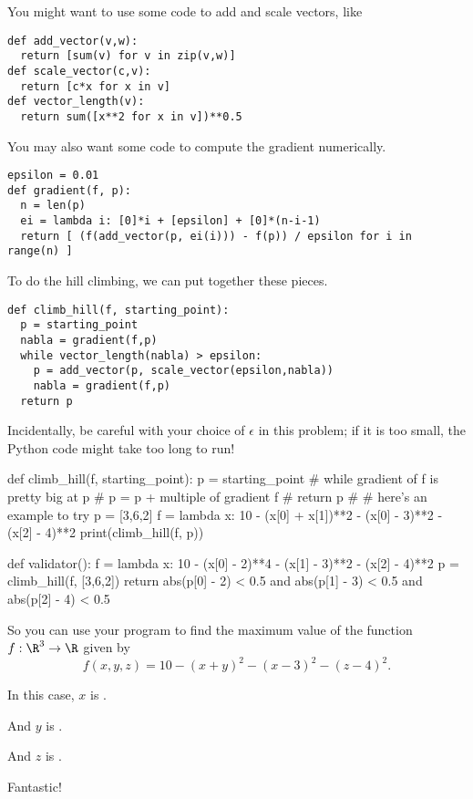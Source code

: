 \documentclass{ximera}
\begin{document}
\begin{question}
  \begin{solution}
    \begin{hint}
       You might want to use some code to add and scale vectors, like
\begin{verbatim}
def add_vector(v,w):
  return [sum(v) for v in zip(v,w)]
def scale_vector(c,v):
  return [c*x for x in v]
def vector_length(v):
  return sum([x**2 for x in v])**0.5
\end{verbatim}
    \end{hint}
    \begin{hint}
      You may also want some code to compute the gradient numerically.
\begin{verbatim}
epsilon = 0.01
def gradient(f, p):
  n = len(p)
  ei = lambda i: [0]*i + [epsilon] + [0]*(n-i-1)
  return [ (f(add_vector(p, ei(i))) - f(p)) / epsilon for i in range(n) ]      
\end{verbatim}
    \end{hint}
    \begin{hint}
To do the hill climbing, we can put together these pieces.
\begin{verbatim}
def climb_hill(f, starting_point):
  p = starting_point
  nabla = gradient(f,p)
  while vector_length(nabla) > epsilon:
    p = add_vector(p, scale_vector(epsilon,nabla))
    nabla = gradient(f,p)
  return p
\end{verbatim}
    \end{hint}
    \begin{hint}
      Incidentally, be careful with your choice of $\epsilon$ in this problem; if it is too small, the Python code might take too long to run!
    \end{hint}
    \begin{python}
def climb_hill(f, starting_point):
  p = starting_point
  # while gradient of f is pretty big at p
  #   p = p + multiple of gradient f
  # return p
#
# here's an example to try
p = [3,6,2]
f = lambda x: 10 - (x[0] + x[1])**2 - (x[0] - 3)**2 - (x[2] - 4)**2
print(climb_hill(f, p))

def validator():
  f = lambda x: 10 - (x[0] - 2)**4 - (x[1] - 3)**2 - (x[2] - 4)**2
  p = climb_hill(f, [3,6,2])
  return abs(p[0] - 2) < 0.5 and abs(p[1] - 3) < 0.5 and abs(p[2] - 4) < 0.5
    \end{python}
  \end{solution}

  So you can use your program to find the maximum value of the function $f : \R^3 \to \R$ given by
  $$
  f(x,y,z) = 10 - (x+y)^2 - (x-3)^2 - (z-4)^2.
  $$
  \begin{solution}
    In this case, $x$ is .
  \end{solution}
  
  \begin{solution}
    And $y$ is .
  \end{solution}
  
  \begin{solution}
    And $z$ is .
  \end{solution}
  
  Fantastic!
  
\end{question}
\end{document}
